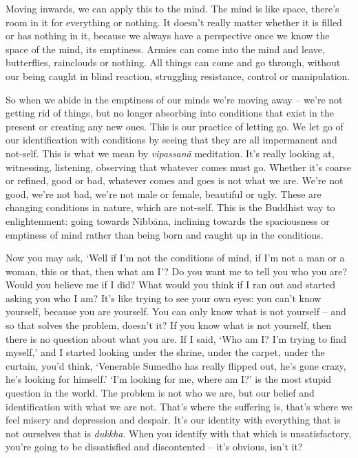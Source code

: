 Moving inwards, we can apply this to the mind. The mind is like space, there's room in it for everything or nothing. It doesn't really matter whether it is filled or has nothing in it, because we always have a perspective once we know the space of the mind, its emptiness. Armies can come into the mind and leave, butterflies, rainclouds or nothing. All things can come and go through, without our being caught in blind reaction, struggling resistance, control or manipulation.

So when we abide in the emptiness of our minds we're moving away -- we're not getting rid of things, but no longer absorbing into conditions that exist in the present or creating any new ones. This is our practice of letting go. We let go of our identification with conditions by seeing that they are all impermanent and not-self. This is what we mean by \textit{vipassan\=a} meditation. It's really looking at, witnessing, listening, observing that whatever comes must go. Whether it's coarse or refined, good or bad, whatever comes and goes is not what we are. We're not good, we're not bad, we're not male or female, beautiful or ugly. These are changing conditions in nature, which are not-self. This is the Buddhist way to enlightenment: going towards Nibb\=ana, inclining towards the spaciousness or emptiness of mind rather than being born and caught up in the conditions.

Now you may ask, `Well if I'm not the conditions of mind, if I'm not a man or a woman, this or that, then what am I'? Do you want me to tell you who you are? Would you believe me if I did? What would you think if I ran out and started asking you who I am? It's like trying to see your own eyes: you can't know yourself, because you are yourself. You can only know what is not yourself -- and so that solves the problem, doesn't it? If you know what is not yourself, then there is no question about what you are. If I said, `Who am I? I'm trying to find myself,' and I started looking under the shrine, under the carpet, under the curtain, you'd think, `Venerable Sumedho has really flipped out, he's gone crazy, he's looking for himself.' `I'm looking for me, where am I?' is the most stupid question in the world. The problem is not who we are, but our belief and identification with what we are not. That's where the suffering is, that's where we feel misery and depression and despair. It's our identity with everything that is not ourselves that is \textit{dukkha}. When you identify with that which is unsatisfactory, you're going to be dissatisfied and discontented -- it's obvious, isn't it?

